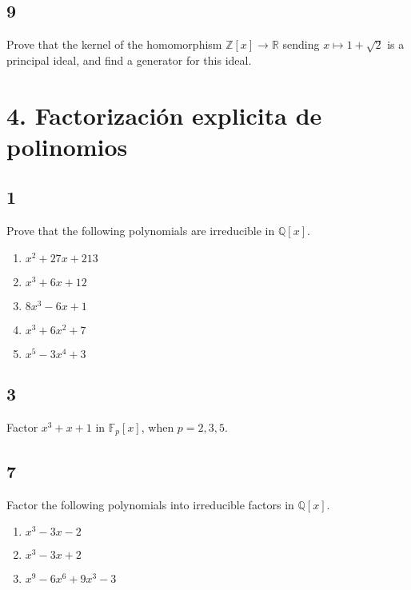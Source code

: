 \documentclass[11pt]{article}
\newcommand{\set}[1]{\mathbb{#1}}
\theoremstyle{definition}
\begin{document}
    \subsection{9}
    Prove that the kernel of the homomorphism $\set{Z}[x]\rightarrow \set{R}$ sending $x\mapsto 1+\sqrt{2}$ is a principal ideal, and find a generator for this ideal.

    \section{4. Factorización explicita de polinomios}
    \subsection{1}
    Prove that the following polynomials are irreducible in $\set{Q}[x]$.
    \begin{enumerate}[label=\textbf{(\alph*)}]
        \item $x^2+27x+213$

        \item $x^3+6x+12$

        \item $8x^3-6x+1$

        \item $x^3+6x^2+7$

        \item $x^5-3x^4+3$
    \end{enumerate}

    \subsection{3}
    Factor $x^3+x+1$ in $\set{F}_p[x]$, when $p=2,3,5$.

    \subsection{7}
    Factor the following polynomials into irreducible factors in $\set{Q}[x]$.
    \begin{enumerate}[label=\textbf{(\alph*)}]
        \item $x^3-3x-2$

        \item $x^3-3x+2$

        \item $x^9-6x^6+9x^3-3$
    \end{enumerate}
    
\end{document}
